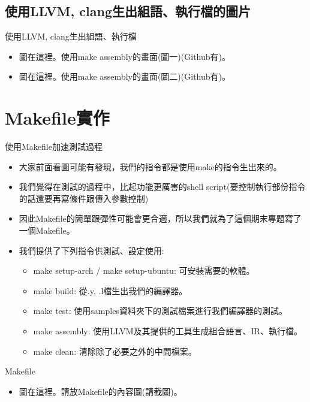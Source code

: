 \documentclass{beamer}
\begin{document}
\subsection{使用LLVM, clang生出組語、執行檔的圖片}
\begin{frame}{使用LLVM, clang生出組語、執行檔}
\begin{itemize}
    \item 
        圖在這裡。使用make assembly的畫面(圖一)(Github有)。
    \item
        圖在這裡。使用make assembly的畫面(圖二)(Github有)。
\end{itemize}
\end{frame}

\section{Makefile實作}
\begin{frame}{使用Makefile加速測試過程}
\begin{itemize}
    \item 大家前面看圖可能有發現，我們的指令都是使用make的指令生出來的。
    \item 我們覺得在測試的過程中，比起功能更厲害的shell script(要控制執行部份指令的話還要再寫條件跟傳入參數控制)
    \item 因此Makefile的簡單跟彈性可能會更合適，所以我們就為了這個期末專題寫了一個Makefile。
    \item 我們提供了下列指令供測試、設定使用:
    \begin{itemize}
        \item make setup-arch / make setup-ubuntu: 可安裝需要的軟體。
        \item make build: 從.y, .l檔生出我們的編譯器。
        \item make test: 使用samples資料夾下的測試檔案進行我們編譯器的測試。
        \item make assembly: 使用LLVM及其提供的工具生成組合語言、IR、執行檔。
        \item make clean: 清除除了必要之外的中間檔案。
    \end{itemize}
\end{itemize}
\end{frame}

\begin{frame}{Makefile}
\begin{itemize}
    \item 圖在這裡。請放Makefile的內容圖(請截圖)。
\end{itemize}
\end{frame}
\end{document}
